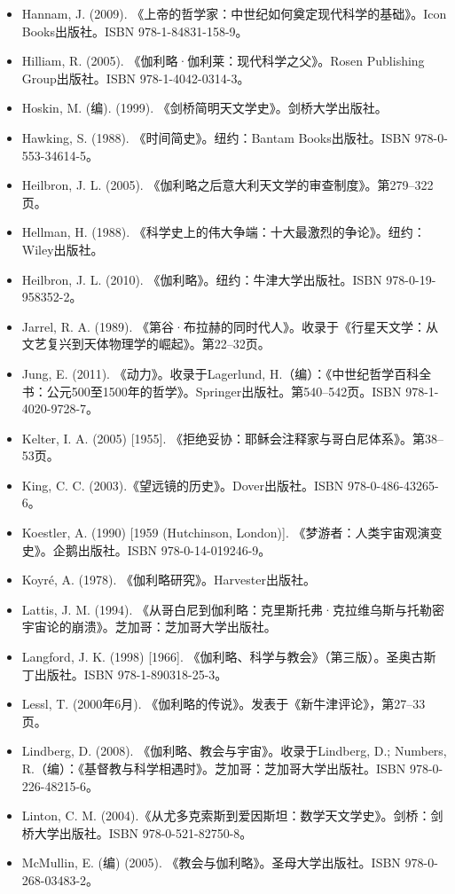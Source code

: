 \begin{itemize}
\item Hannam, J. (2009). 《上帝的哲学家：中世纪如何奠定现代科学的基础》。Icon Books出版社。ISBN 978-1-84831-158-9。
\item Hilliam, R. (2005). 《伽利略·伽利莱：现代科学之父》。Rosen Publishing Group出版社。ISBN 978-1-4042-0314-3。
\item Hoskin, M. (编). (1999). 《剑桥简明天文学史》。剑桥大学出版社。
\item Hawking, S. (1988). 《时间简史》。纽约：Bantam Books出版社。ISBN 978-0-553-34614-5。
\item Heilbron, J. L. (2005). 《伽利略之后意大利天文学的审查制度》。第279–322页。
\item Hellman, H. (1988). 《科学史上的伟大争端：十大最激烈的争论》。纽约：Wiley出版社。
\item Heilbron, J. L. (2010). 《伽利略》。纽约：牛津大学出版社。ISBN 978-0-19-958352-2。
\item Jarrel, R. A. (1989). 《第谷·布拉赫的同时代人》。收录于《行星天文学：从文艺复兴到天体物理学的崛起》。第22–32页。
\item Jung, E. (2011). 《动力》。收录于Lagerlund, H.（编）：《中世纪哲学百科全书：公元500至1500年的哲学》。Springer出版社。第540–542页。ISBN 978-1-4020-9728-7。
\item Kelter, I. A. (2005) [1955]. 《拒绝妥协：耶稣会注释家与哥白尼体系》。第38–53页。
\item King, C. C. (2003).《望远镜的历史》。Dover出版社。ISBN 978-0-486-43265-6。
\item Koestler, A. (1990) [1959 (Hutchinson, London)]. 《梦游者：人类宇宙观演变史》。企鹅出版社。ISBN 978-0-14-019246-9。
\item Koyré, A. (1978). 《伽利略研究》。Harvester出版社。
\item Lattis, J. M. (1994). 《从哥白尼到伽利略：克里斯托弗·克拉维乌斯与托勒密宇宙论的崩溃》。芝加哥：芝加哥大学出版社。
\item Langford, J. K. (1998) [1966]. 《伽利略、科学与教会》（第三版）。圣奥古斯丁出版社。ISBN 978-1-890318-25-3。
\item Lessl, T. (2000年6月). 《伽利略的传说》。发表于《新牛津评论》，第27–33页。
\item Lindberg, D. (2008). 《伽利略、教会与宇宙》。收录于Lindberg, D.; Numbers, R.（编）：《基督教与科学相遇时》。芝加哥：芝加哥大学出版社。ISBN 978-0-226-48215-6。
\item Linton, C. M. (2004).《从尤多克索斯到爱因斯坦：数学天文学史》。剑桥：剑桥大学出版社。ISBN 978-0-521-82750-8。
\item McMullin, E. (编) (2005). 《教会与伽利略》。圣母大学出版社。ISBN 978-0-268-03483-2。

\end{itemize}
